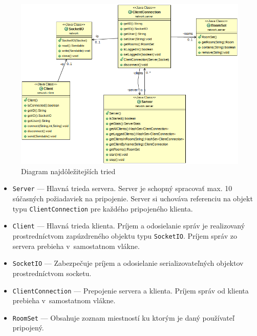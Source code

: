 \documentclass[11pt]{article}
\begin{document}
\begin{figure}[h]
	\includegraphics[width=\textwidth]{UML-network.png}
	\caption{Diagram najdôležitejších tried}
\end{figure}

\begin{itemize}
	\item \texttt{Server} --- Hlavná trieda servera. Server je schopný spracovať max. 10
	      súčasných požiadaviek na pripojenie. Server si uchováva referenciu na
		  objekt typu \texttt{ClientConnection} pre každého pripojeného klienta.
	\item \texttt{Client} --- Hlavná trieda klienta. Príjem a odosielanie správ je
	      realizovaný prostredníctvom zapúzdreného objektu typu
		  \texttt{SocketIO}. Príjem správ zo servera prebieha v~samostatnom vlákne.
	\item \texttt{SocketIO} --- Zabezpečuje príjem a odosielanie
	      serializovateľných objektov prostredníctvom socketu.
	\item \texttt{ClientConnection} --- Prepojenie servera a klienta. Príjem správ od
	      klienta prebieha v~samostatnom vlákne.
	\item \texttt{RoomSet} --- Obsahuje zoznam miestností ku ktorým je daný
	      používateľ pripojený.
\end{itemize}
\end{document}
